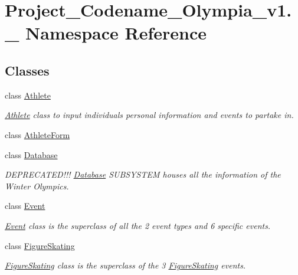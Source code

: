 \hypertarget{namespaceProject__Codename__Olympia__v1_1_1__0}{}\section{Project\+\_\+\+Codename\+\_\+\+Olympia\+\_\+v1.\+\_ Namespace Reference}
\label{namespaceProject__Codename__Olympia__v1_1_1__0}
\subsection*{Classes}
\begin{DoxyCompactItemize}
\item 
class \hyperlink{classProject__Codename__Olympia__v1_1_1__0_1_1Athlete}{Athlete}
\begin{DoxyCompactList}\small\item\em \hyperlink{classProject__Codename__Olympia__v1_1_1__0_1_1Athlete}{Athlete} class to input individual\textquotesingle{}s personal information and events to partake in. \end{DoxyCompactList}\item 
class \hyperlink{classProject__Codename__Olympia__v1_1_1__0_1_1AthleteForm}{Athlete\+Form}
\item 
class \hyperlink{classProject__Codename__Olympia__v1_1_1__0_1_1Database}{Database}
\begin{DoxyCompactList}\small\item\em D\+E\+P\+R\+E\+C\+A\+T\+E\+D!!! \hyperlink{classProject__Codename__Olympia__v1_1_1__0_1_1Database}{Database} S\+U\+B\+S\+Y\+S\+T\+EM houses all the information of the Winter Olympics. \end{DoxyCompactList}\item 
class \hyperlink{classProject__Codename__Olympia__v1_1_1__0_1_1Event}{Event}
\begin{DoxyCompactList}\small\item\em \hyperlink{classProject__Codename__Olympia__v1_1_1__0_1_1Event}{Event} class is the superclass of all the 2 event types and 6 specific events. \end{DoxyCompactList}\item 
class \hyperlink{classProject__Codename__Olympia__v1_1_1__0_1_1FigureSkating}{Figure\+Skating}
\begin{DoxyCompactList}\small\item\em \hyperlink{classProject__Codename__Olympia__v1_1_1__0_1_1FigureSkating}{Figure\+Skating} class is the superclass of the 3 \hyperlink{classProject__Codename__Olympia__v1_1_1__0_1_1FigureSkating}{Figure\+Skating} events. \end{DoxyCompactList}\item 

\end{DoxyCompactItemize}
